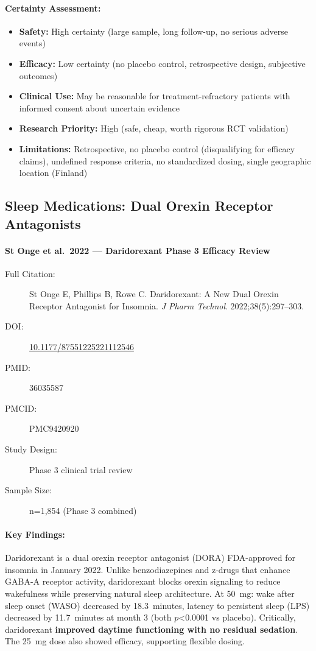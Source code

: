 \paragraph{Certainty Assessment:}
\begin{itemize}
    \item \textbf{Safety:} High certainty (large sample, long follow-up, no serious adverse events)
    \item \textbf{Efficacy:} Low certainty (no placebo control, retrospective design, subjective outcomes)
    \item \textbf{Clinical Use:} May be reasonable for treatment-refractory patients with informed consent about uncertain evidence
    \item \textbf{Research Priority:} High (safe, cheap, worth rigorous RCT validation)
    \item \textbf{Limitations:} Retrospective, no placebo control (disqualifying for efficacy claims), undefined response criteria, no standardized dosing, single geographic location (Finland)
\end{itemize}

\subsection{Sleep Medications: Dual Orexin Receptor Antagonists}

\paragraph{St Onge et al.\ 2022 --- Daridorexant Phase 3 Efficacy Review}

\begin{description}
    \item[Full Citation:] St Onge E, Phillips B, Rowe C. Daridorexant: A New Dual Orexin Receptor Antagonist for Insomnia. \textit{J Pharm Technol}. 2022;38(5):297--303.
    \item[DOI:] \href{https://doi.org/10.1177/87551225221112546}{10.1177/87551225221112546}
    \item[PMID:] 36035587
    \item[PMCID:] PMC9420920
    \item[Study Design:] Phase 3 clinical trial review
    \item[Sample Size:] n=1,854 (Phase 3 combined)
\end{description}

\paragraph{Key Findings:}
Daridorexant is a dual orexin receptor antagonist (DORA) FDA-approved for insomnia in January 2022. Unlike benzodiazepines and z-drugs that enhance GABA-A receptor activity, daridorexant blocks orexin signaling to reduce wakefulness while preserving natural sleep architecture. At 50~mg: wake after sleep onset (WASO) decreased by 18.3~minutes, latency to persistent sleep (LPS) decreased by 11.7~minutes at month 3 (both $p$<0.0001 vs placebo). Critically, daridorexant \textbf{improved daytime functioning with no residual sedation}. The 25~mg dose also showed efficacy, supporting flexible dosing.

